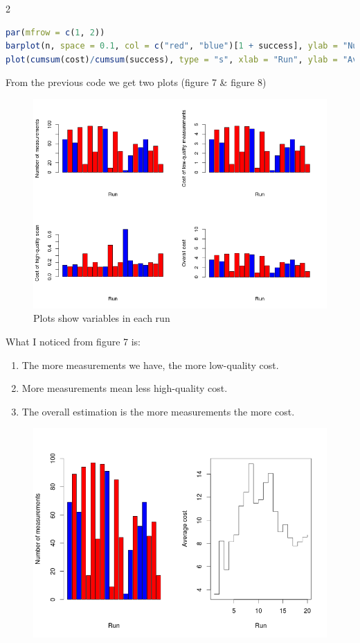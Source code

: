 \documentclass{article}
\begin{document}
\begin{multicols*}{2}
\begin{flushleft}
\begin{flushleft}
\begin{lstlisting}[language=R]
par(mfrow = c(1, 2))
barplot(n, space = 0.1, col = c("red", "blue")[1 + success], ylab = "Number of measurements", ylim=c(0, 100),  xlab = "Run")
plot(cumsum(cost)/cumsum(success), type = "s", xlab = "Run", ylab = "Average cost")
\end{lstlisting}
From the previous code we get two plots (figure 7 \& figure 8)
\begin{figure}[H]
\begin{center}
\includegraphics[scale=0.3]{plotm1p1.png}
\end{center}
\caption{Plots show variables in each run}
\end{figure}
What I noticed from figure 7 is:
\begin{enumerate}
	\item The more measurements we have, the more low-quality cost.
	\item More measurements mean less high-quality cost.
	\item The overall estimation is the more measurements the more cost.
\end{enumerate}
\begin{figure}[H]
	\begin{center}
		\includegraphics[scale=0.3]{plotm1p2.png}

\end{center}
\end{figure}
\end{flushleft}
\end{flushleft}
\end{multicols*}
\end{document}
